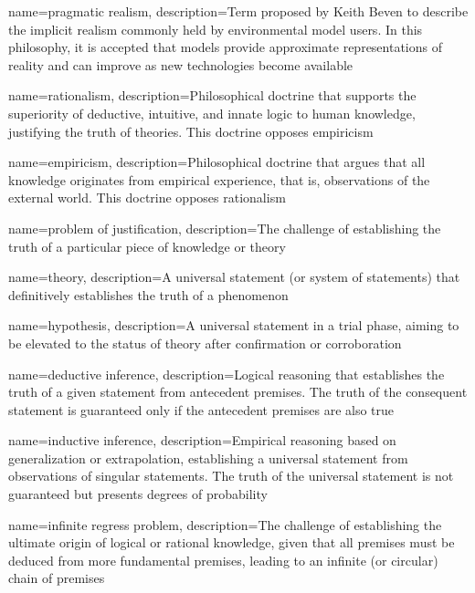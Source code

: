\makeglossaries

{
    name=pragmatic realism,
    description={Term proposed by Keith Beven to describe the implicit realism commonly held by environmental model users. In this philosophy, it is accepted that models provide approximate representations of reality and can improve as new technologies become available}
}

{
    name=rationalism,
    description={Philosophical doctrine that supports the superiority of deductive, intuitive, and innate logic to human knowledge, justifying the truth of theories. This doctrine opposes empiricism}
}

{
    name=empiricism,
    description={Philosophical doctrine that argues that all knowledge originates from empirical experience, that is, observations of the external world. This doctrine opposes rationalism}
}

{
    name=problem of justification,
    description={The challenge of establishing the truth of a particular piece of knowledge or theory}
}

{
    name=theory,
    description={A universal statement (or system of statements) that definitively establishes the truth of a phenomenon}
}

{
    name=hypothesis,
    description={A universal statement in a trial phase, aiming to be elevated to the status of theory after confirmation or corroboration}
}

{
    name=deductive inference,
    description={Logical reasoning that establishes the truth of a given statement from antecedent premises. The truth of the consequent statement is guaranteed only if the antecedent premises are also true}
}

{
    name=inductive inference,
    description={Empirical reasoning based on generalization or extrapolation, establishing a universal statement from observations of singular statements. The truth of the universal statement is not guaranteed but presents degrees of probability}
}

{
    name=infinite regress problem,
    description={The challenge of establishing the ultimate origin of logical or rational knowledge, given that all premises must be deduced from more fundamental premises, leading to an infinite (or circular) chain of premises}
}

